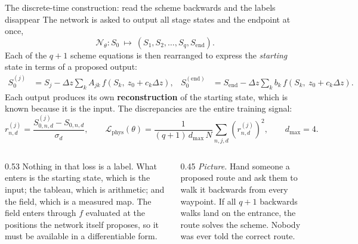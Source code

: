 \documentclass[aspectratio=169,10pt]{beamer}
\newcommand{\hl}[1]{{\color{accent}\textbf{#1}}}
\begin{document}
\begin{frame}[shrink=25]{The discrete-time construction: read the scheme backwards and the labels disappear}
  \vspace{1mm}
  The network is asked to output all stage states and the endpoint at once,
  \[ \mathcal{N}_\theta : S_0 \ \longmapsto\ (S_1, S_2, \dots, S_q, S_{\mathrm{end}}). \]
  Each of the $q+1$ scheme equations is then rearranged to express the
  \emph{starting} state in terms of a proposed output:
  \begin{align*}
    S_0^{(j)} &= S_j - \Delta z \sum_{k} A_{jk}\,
                  f\!\left(S_k,\ z_0 + c_k \Delta z\right), &
    S_0^{(\mathrm{end})} &= S_{\mathrm{end}} - \Delta z \sum_{k} b_k\,
                  f\!\left(S_k,\ z_0 + c_k \Delta z\right).
  \end{align*}
  Each output produces its own \hl{reconstruction} of the starting state, which
  is known because it is the input. The discrepancies are the entire training
  signal:
  \[ r^{(j)}_{n,d} = \frac{S_{0,n,d}^{(j)} - S_{0,n,d}}{\sigma_d},
     \qquad
     \mathcal{L}_{\mathrm{phys}}(\theta)
       = \frac{1}{(q+1)\,d_{\max}\,N} \sum_{n,j,d} \left(r^{(j)}_{n,d}\right)^2,
     \qquad d_{\max} = 4. \]
  \vspace{-3mm}
  \begin{columns}[T]
    \begin{column}{0.53\textwidth}
      {\small Nothing in that loss is a label. What enters is the starting
       state, which is the input; the tableau, which is arithmetic; and the
       field, which is a measured map. The field enters through $f$ evaluated at
       the positions the network itself proposes, so it must be available in a
       differentiable form.}
    \end{column}
    \begin{column}{0.45\textwidth}
      {\small\emph{Picture.} Hand someone a proposed route and ask them to walk
       it backwards from every waypoint. If all $q+1$ backwards walks land on
       the entrance, the route solves the scheme. Nobody was ever told the
       correct route.}
    \end{column}
  \end{columns}
\end{frame}
\end{document}
